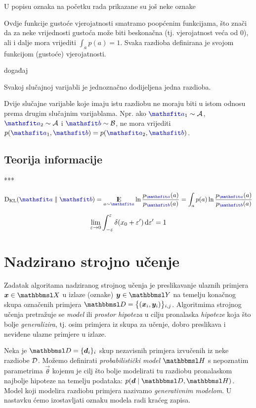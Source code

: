 \documentclass[utf8, diplomski, lmodern]{fer}
\begin{document}
U popisu oznaka na početku rada prikazane su još neke oznake 

Ovdje funkcije gustoće vjerojatnosti smatramo poopćenim funkcijama, što znači da za neke vrijednosti gustoća može biti beskonačna (tj. vjerojatnost veća od $0$), ali i dalje mora vrijediti $\int_a p(a)=1$. Svaka razdioba definirana je svojom funkcijom (gustoće) vjerojatnosti.

događaj

Svakoj slučajnoj varijabli je jednoznačno dodijeljena jedna razdioba.

Dvije slučajne varijable koje imaju istu razdiobu ne moraju biti u istom odnosu prema drugim slučajnim varijablama. Npr. ako $\rvar a_1\sim\mathcal A$, $\rvar a_2\sim\mathcal A$ i $\rvar b\sim\mathcal B$, ne mora vrijediti $p(\rvar a_1, \rvar b) = p(\rvar a_2, \rvar b)$.

\subsection{Teorija informacije}
***

\begin{align}
	\Dkl{\rvar a}{\rvar b} = \E_{a\sim\rvar a} \ln\frac{p_{\rvar a}(a)}{p_{\rvar b}(a)} = \int_a p(a) \ln\frac{p_{\rvar a}(a)}{p_{\rvar b}(a)}
\end{align}

\begin{align}
\lim_{\varepsilon\to 0} \int_{-\varepsilon}^{\varepsilon} \delta(x_0+\varepsilon') \dif\varepsilon' = 1
\end{align}


\section{Nadzirano strojno učenje}

Zadatak algoritama nadziranog strojnog učenja je preslikavanje ulaznih primjera $\vec x\in\set{X}$ u izlaze (oznake) $\vec y\in\set{Y}$ na temelju konačnog skupa označenih primjera $\set{D} = \cbr{\del{\vec x_i,\vec y_i}}_{i,j}$. Algoritmima strojnog učenja pretražuje se \emph{model} ili \emph{prostor hipoteza} u cilju pronalaska \emph{hipoteze} koja što bolje \emph{generalizira}, tj. osim primjera iz skupa za učenje, dobro preslikava i neviđene ulazne primjere u izlaze.

Neka je $\set{D}=\cbr{\vec d_i}_i$ skup nezavisnih primjera izvučenih iz neke razdiobe $\mathcal{D}$. Možemo definirati \emph{probabilistički model} $\set H$ s nepoznatim parametrima $\vec\theta$ kojemu je cilj što bolje modelirati tu razdiobu pronalaskom najbolje hipoteze na temelju podataka: $p(\vec{d}\mid\set{D},\set H)$. Model koji modelira razdiobu primjera nazivamo \emph{generativnim modelom}. U nastavku ćemo izostavljati oznaku modela radi kraćeg zapisa.
\end{document}
